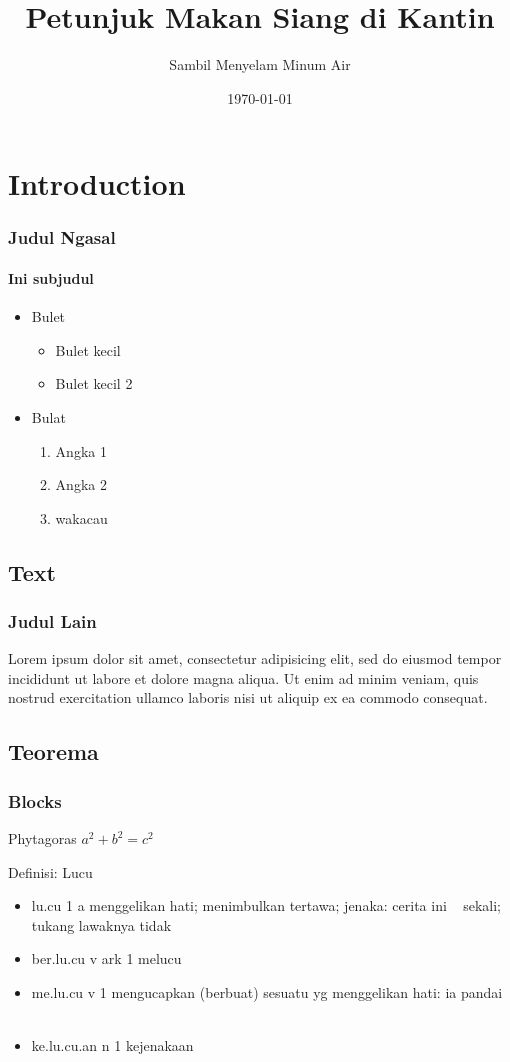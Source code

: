 \documentclass{beamer}
\title{Petunjuk Makan Siang di Kantin}
\subtitle{Sambil Menyelam Minum Air}
\date{\today}
\institute{Gedung Sate Bundar}
\begin{document}
\begin{frame}
\titlepage
\end{frame}

\section{Introduction}    
\frame{\sectionpage}
\begin{frame}
\frametitle{Judul Ngasal}
\framesubtitle{Ini subjudul}
\begin{itemize}
\item Bulet
	\begin{itemize}
	\item Bulet kecil
	\item Bulet kecil 2
	\end{itemize}
\item Bulat
	\begin{enumerate}
	\item Angka 1
	\item Angka 2
	\item \alert{wakacau}
	\end{enumerate}
\end{itemize}
\end{frame}

\subsection{Text}
\begin{frame}
\frametitle{Judul Lain}
Lorem ipsum dolor sit amet, consectetur adipisicing elit, sed do eiusmod tempor incididunt ut labore et dolore magna aliqua. Ut enim ad minim veniam, quis nostrud exercitation ullamco laboris nisi ut aliquip ex ea commodo consequat.
\end{frame}

\subsection{Teorema}
\begin{frame}
\frametitle{Blocks}
\begin{block}{Phytagoras}
$a^2 + b^2 = c^2$
\end{block}

\begin{block}{Definisi: Lucu}
\begin{itemize}
\item lu.cu 1 a menggelikan hati; menimbulkan tertawa; jenaka: cerita ini ~ sekali; tukang lawaknya tidak ~
\item ber.lu.cu v ark 1 melucu
\item me.lu.cu v 1 mengucapkan (berbuat) sesuatu yg menggelikan hati: ia pandai ~
\item ke.lu.cu.an n 1 kejenakaan
\end{itemize}
\end{block}
\end{frame}
\end{document}

